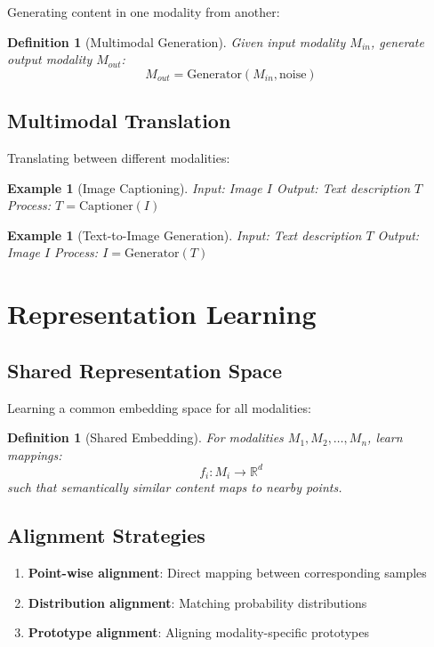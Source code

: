 \documentclass[11pt,a4paper]{article}
\newtheorem{definition}[theorem]{Definition}
\newtheorem{example}[theorem]{Example}
\begin{document}
Generating content in one modality from another:

\begin{definition}[Multimodal Generation]
Given input modality $M_{in}$, generate output modality $M_{out}$:
$$M_{out} = \text{Generator}(M_{in}, \text{noise})$$
\end{definition}

\subsection{Multimodal Translation}

Translating between different modalities:

\begin{example}[Image Captioning]
Input: Image $I$
Output: Text description $T$
Process: $T = \text{Captioner}(I)$
\end{example}

\begin{example}[Text-to-Image Generation]
Input: Text description $T$
Output: Image $I$
Process: $I = \text{Generator}(T)$
\end{example}

\section{Representation Learning}

\subsection{Shared Representation Space}

Learning a common embedding space for all modalities:

\begin{definition}[Shared Embedding]
For modalities $M_1, M_2, \ldots, M_n$, learn mappings:
$$f_i: M_i \rightarrow \mathbb{R}^d$$
such that semantically similar content maps to nearby points.
\end{definition}

\subsection{Alignment Strategies}

\begin{enumerate}
\item \textbf{Point-wise alignment}: Direct mapping between corresponding samples
\item \textbf{Distribution alignment}: Matching probability distributions
\item \textbf{Prototype alignment}: Aligning modality-specific prototypes
\end{enumerate}
\end{document}

